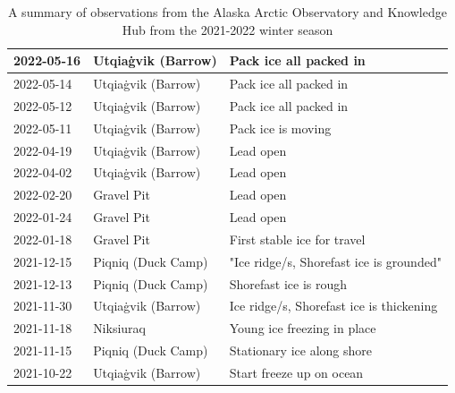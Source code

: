 \begin{table}
\begin{tabular}{|l|l|l|}
        2022-05-16 & Utqiaġvik (Barrow) & Pack ice all packed in \\ \hline
        2022-05-14 & Utqiaġvik (Barrow) & Pack ice all packed in \\ \hline
        2022-05-12 & Utqiaġvik (Barrow) & Pack ice all packed in \\ \hline
        2022-05-11 & Utqiaġvik (Barrow) & Pack ice is moving \\ \hline
        2022-04-19 & Utqiaġvik (Barrow) & Lead open \\ \hline
        2022-04-02 & Utqiaġvik (Barrow) & Lead open \\ \hline
        2022-02-20 & Gravel Pit & Lead open \\ \hline
        2022-01-24 & Gravel Pit & Lead open \\ \hline
        2022-01-18 & Gravel Pit & First stable ice for travel \\ \hline
        2021-12-15 & Piqniq (Duck Camp) & "Ice ridge/s, Shorefast ice is grounded" \\ \hline
        2021-12-13 & Piqniq (Duck Camp) & Shorefast ice is rough \\ \hline
        2021-11-30 & Utqiaġvik (Barrow) & Ice ridge/s, Shorefast ice is thickening\\ \hline
        2021-11-18 & Niksiuraq & Young ice freezing in place \\ \hline
        2021-11-15 & Piqniq (Duck Camp) & Stationary ice along shore \\ \hline
        2021-10-22 & Utqiaġvik (Barrow) & Start freeze up on ocean \\ \hline
    \end{tabular}
    \caption{A summary of observations from the Alaska Arctic Observatory and Knowledge Hub from the 2021-2022 winter season}
\end{table}




